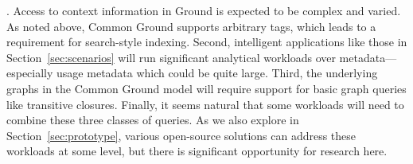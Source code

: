 \documentclass{sig-alternate}
\begin{document}



.  Access to context information in Ground is expected to be complex and varied. As noted above, Common Ground supports arbitrary tags, which leads to a requirement for search-style indexing.
Second, intelligent applications like those in Section~\ref{sec:scenarios} will run significant analytical workloads over metadata---especially usage metadata which could be quite large.  Third, the underlying graphs in the Common Ground model will require support for basic graph queries like transitive closures. Finally, it seems natural that some workloads will need to combine these three classes of queries.
As we also explore in Section~\ref{sec:prototype}, various open-source solutions can address these workloads at some level, but there is significant opportunity for research here.
\end{document}
